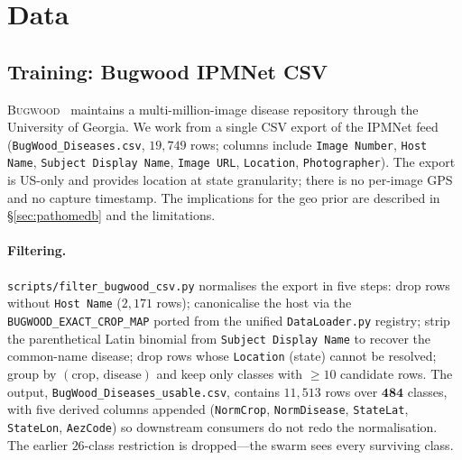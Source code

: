 \documentclass[11pt,twocolumn]{article}
\newcommand{\bugwood}{\textsc{Bugwood}\xspace}
\begin{document}
\section{Data}
\label{sec:data}

\subsection{Training: Bugwood IPMNet CSV}

\bugwood~\citep{bugwood} maintains a
multi-million-image disease repository through
the University of Georgia. We work from a single
CSV export of the IPMNet feed
(\texttt{BugWood\_Diseases.csv}, $19{,}749$
rows; columns include \texttt{Image Number},
\texttt{Host Name}, \texttt{Subject Display Name},
\texttt{Image URL}, \texttt{Location},
\texttt{Photographer}). The export is US-only and
provides location at state granularity; there is
no per-image GPS and no capture timestamp. The
implications for the geo prior are described in
\S\ref{sec:pathomedb} and the limitations.

\paragraph{Filtering.}
\texttt{scripts/filter\_bugwood\_csv.py}
normalises the export in five steps: drop rows
without \texttt{Host Name} ($2{,}171$ rows);
canonicalise the host via the
\texttt{BUGWOOD\_EXACT\_CROP\_MAP} ported from
the unified \texttt{DataLoader.py} registry;
strip the parenthetical Latin binomial from
\texttt{Subject Display Name} to recover the
common-name disease; drop rows whose
\texttt{Location} (state) cannot be resolved;
group by $(\text{crop},\,\text{disease})$ and
keep only classes with $\geq{10}$ candidate rows.
The output, \texttt{BugWood\_Diseases\_usable.csv},
contains $11{,}513$ rows over $\mathbf{484}$
classes, with five derived columns appended
(\texttt{NormCrop}, \texttt{NormDisease},
\texttt{StateLat}, \texttt{StateLon},
\texttt{AezCode}) so downstream consumers do
not redo the normalisation. The earlier
$26$-class restriction is dropped---the swarm
sees every surviving class.
\end{document}
